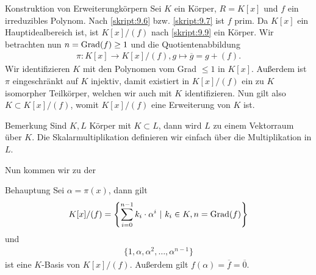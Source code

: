 \begin{genericdf}{Konstruktion von Erweiterungkörpern}\label{skript:9.10}
	Sei $ K $ ein Körper, $ R  = K[x]$ und $ f $ ein irreduzibles Polynom.
	Nach \ref{skript:9.6} bzw. \ref{skript:9.7} ist $ f $ prim.
	Da $ K[x] $ ein Hauptidealbereich ist, ist $ K[x] / (f) $ nach 
	\ref{skript:9.9} ein Körper.
	Wir betrachten nun $ n = \operatorname{Grad}(f) \geq 1$ und die Quotientenabbildung
	\begin{align*}
	\pi : K[x] \to K[x] / (f), g \mapsto \overline{g} = g + (f).
	\end{align*}
	Wir identifizieren $ K $ mit den Polynomen vom Grad $ \leq 1 $ in $ K[x] $.
	Außerdem ist $ \pi $ eingeschränkt auf $ K $ injektiv, damit existiert in
	$ K[x] / (f) $ ein zu $ K $ isomorpher Teilkörper, welchen wir auch mit $ K $
	identifizieren.
	Nun gilt also $ K \subset K[x] / (f) $,
	womit $ K[x] / (f) $ eine Erweiterung von $ K $ ist.
	\begin{generic_no_num}{Bemerkung}
		Sind $ K,L $ Körper mit $ K \subset L $, dann wird $ L $ zu einem Vektorraum über $ K $.
		Die Skalarmultiplikation definieren wir einfach über die Multiplikation in $ L $.
	\end{generic_no_num}
	Nun kommen wir zu der 
	\begin{genericthm_no_num}{Behauptung}
		Sei $ \alpha = \pi(x) $, dann gilt
		\begin{align*}
		K[x] / (f) = \left\lbrace \sum \limits_{i=0}^{n-1}  k_i \cdot \alpha^i 
		\ | \ k_i \in K , n = \operatorname{Grad}(f)\right\rbrace
		\end{align*}
		und
		\begin{align*}
		\lbrace 1, \alpha, \alpha^2, \dots , \alpha^{n-1} \rbrace
		\end{align*}
		ist eine $ K $-Basis von $ K[x] / (f) $.
		Außerdem gilt $ f (\alpha) = \overline{f} = \overline{0} $.
	\end{genericthm_no_num}
	

\end{genericdf}
